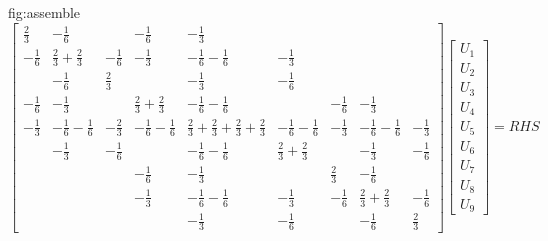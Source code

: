    {fig:assemble}
\begin{equation}
  \begin{bmatrix}
    \frac{2}{3} &-\frac{1}{6} &\frac{}{} &-\frac{1}{6} 
          &-\frac{1}{3} 
          &\frac{}{} &\frac{}{} &\frac{}{} &\frac{}{} \\
    -\frac{1}{6} &\frac{2}{3}+\frac{2}{3} &-\frac{1}{6} &-\frac{1}{3} 
          &-\frac{1}{6}-\frac{1}{6} 
          &-\frac{1}{3} &\frac{}{} &\frac{}{} &\frac{}{} \\
    \frac{}{} &-\frac{1}{6} &\frac{2}{3} &\frac{}{} 
          &-\frac{1}{3} 
          &-\frac{1}{6} &\frac{}{} &\frac{}{} &\frac{}{} \\
    -\frac{1}{6} &-\frac{1}{3} &\frac{}{} &\frac{2}{3}+\frac{2}{3} 
          &-\frac{1}{6}-\frac{1}{6} 
          &\frac{}{} &-\frac{1}{6} &-\frac{1}{3} &\frac{}{} \\
    -\frac{1}{3} &-\frac{1}{6}-\frac{1}{6} &-\frac{2}{3} &-\frac{1}{6}-\frac{1}{6} 
          & \frac{2}{3}+\frac{2}{3}+\frac{2}{3}+\frac{2}{3} 
          & -\frac{1}{6}-\frac{1}{6}
          &-\frac{1}{3} &-\frac{1}{6}-\frac{1}{6} &-\frac{1}{3} \\
    \frac{}{} &-\frac{1}{3} &-\frac{1}{6} &\frac{}{} 
          &-\frac{1}{6}-\frac{1}{6}
          &\frac{2}{3}+\frac{2}{3} &\frac{}{} &-\frac{1}{3} &-\frac{1}{6} \\
    \frac{}{} &\frac{}{} &\frac{}{} &-\frac{1}{6} 
          &-\frac{1}{3} 
          &\frac{}{} &\frac{2}{3} &-\frac{1}{6} &\frac{}{} \\
    \frac{}{} &\frac{}{} &\frac{}{} &-\frac{1}{3} 
          &-\frac{1}{6}-\frac{1}{6} 
          &-\frac{1}{3} &-\frac{1}{6} &\frac{2}{3}+\frac{2}{3} &-\frac{1}{6} \\
    \frac{}{} &\frac{}{} &\frac{}{} &\frac{}{} 
          &-\frac{1}{3} 
          &-\frac{1}{6} &\frac{}{} &-\frac{1}{6} &\frac{2}{3}
  \end{bmatrix}
  \begin{bmatrix}
    U_{1} \\
    U_{2} \\
    U_{3} \\
    U_{4} \\
    U_{5} \\
    U_{6} \\
    U_{7} \\
    U_{8} \\
    U_{9}
  \end{bmatrix}
  = RHS
\end{equation}
